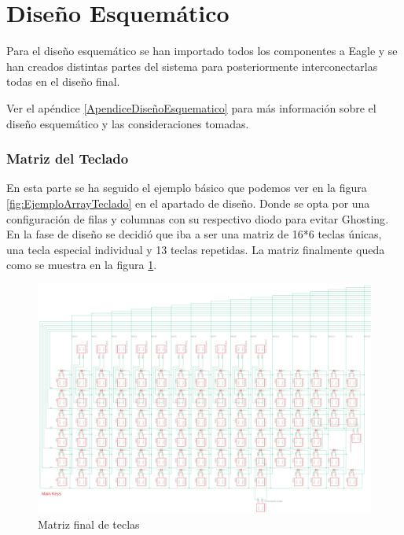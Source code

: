 \newpage
\section{Diseño Esquemático}
Para el diseño esquemático se han importado todos los componentes a Eagle y se han creados distintas partes del sistema para posteriormente interconectarlas todas en el diseño final.

\begin{tcolorbox}[colback=blue!5!white, colframe=blue!55!white, title=Nota]
    Ver el apéndice \ref{ApendiceDiseñoEsquematico} para más información sobre el diseño esquemático y las consideraciones tomadas. 
\end{tcolorbox}

\subsubsection{Matriz del Teclado}
En esta parte se ha seguido el ejemplo básico que podemos ver en la figura \ref{fig:EjemploArrayTeclado} en el apartado de diseño. Donde se opta por una configuración de filas y columnas con su respectivo diodo para evitar \gls{Ghosting}. En la fase de diseño se decidió que iba a ser una matriz de 16*6 teclas únicas, una tecla especial individual y 13 teclas repetidas. La matriz finalmente queda como se muestra en la figura \ref{fig:MatrizTeclas}.

\begin{figure}[H]
    \centering
    \includegraphics[width=1.0\textwidth]{imagenes/Capitulos/Cap04/MatrizTeclas.png}
    \caption{Matriz final de teclas}
    \label{fig:MatrizTeclas}
\end{figure}

